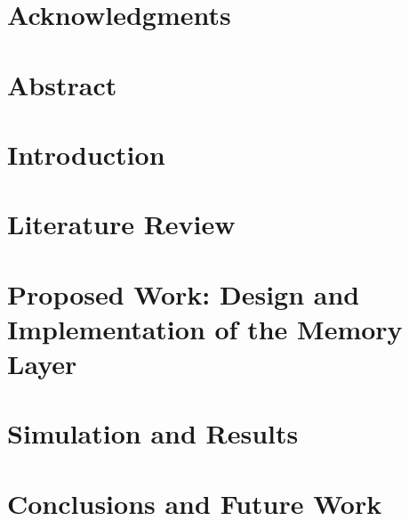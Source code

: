 \documentclass[a4paper, 11pt, oneside]{Dissertation}
\begin{document}
\sloppy
{}







\chapter*{Acknowledgments}
\label{ch:ack}


\chapter*{Abstract}
\label{ch:abstract}


\pagestyle{fancy}
\tableofcontents
\listoffigures
\listoftables
\newpage

\mainmatter

\chapter{Introduction}
\label{ch:intro}


\chapter{Literature Review}
\label{ch:literature}


\chapter{Proposed Work: Design and Implementation of the Memory Layer}
\label{ch:new}


\chapter{Simulation and Results}
\label{ch:result}


\chapter{Conclusions and Future Work}
\label{ch:conclude}


\newpage



\end{document}
